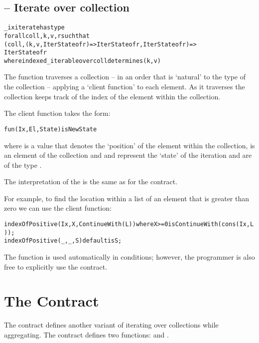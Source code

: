 \subsection{ -- Iterate over collection}
\label{iterateFunction}
\begin{alltt}
_ixiterate has type 
    for all coll,k,v,r such that 
      (coll,(k,v,IterState of r)=>IterState of r,IterState of r) => 
        IterState of r
      where indexed\_iterable over coll determines (k,v)
\end{alltt}

The  function traverses a collection -- in an order that is `natural' to the type of the collection -- applying a `client function' to each element. As it traverses the collection  keeps track of the index of the element within the collection.

The client function takes the form:
\begin{alltt}
fun(Ix,El,State) is NewState
\end{alltt}
where  is a value that denotes the `position' of the element within the collection,  is an element of the collection and  and  represent the `state' of the iteration and are of the type .

The interpretation of the  is the same as for the  contract.

For example, to find the location within a  list of an element that is greater than zero we can use the client function:
\begin{alltt}
indexOfPositive(Ix,X, ContinueWith(L)) where X>=0 is ContinueWith(cons(Ix,L));
indexOfPositive(_,_,S) default is S;
\end{alltt}
\begin{aside}
The  function is used automatically in  conditions; however, the programmer is also free to explicitly use the  contract.
\end{aside}

\section{The  Contract}
\label{foldableContract}
The  contract defines another variant of iterating over collections while aggregating. The  contract defines two functions:  and .

